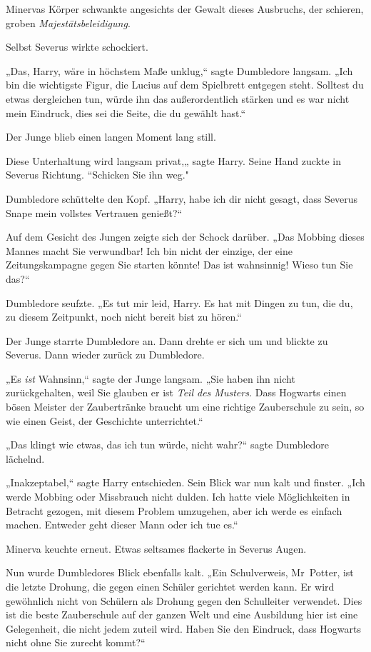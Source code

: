 {Minervas Körper schwankte angesichts der Gewalt dieses Ausbruchs, der schieren, groben \emph{Majestätsbeleidigung}.

Selbst Severus wirkte schockiert.

„Das, Harry, wäre in höchstem Maße unklug,“ sagte Dumbledore langsam. „Ich bin die wichtigste Figur, die Lucius auf dem Spielbrett entgegen steht. Solltest du etwas dergleichen tun, würde ihn das außerordentlich stärken und es war nicht mein Eindruck, dies sei die Seite, die du gewählt hast.“

Der Junge blieb einen langen Moment lang still.

Diese Unterhaltung wird langsam privat,„ sagte Harry. Seine Hand zuckte in Severus Richtung. “Schicken Sie ihn weg."

Dumbledore schüttelte den Kopf. „Harry, habe ich dir nicht gesagt, dass Severus Snape mein vollstes Vertrauen genießt?“

Auf dem Gesicht des Jungen zeigte sich der Schock darüber. „Das Mobbing dieses Mannes macht Sie verwundbar! Ich bin nicht der einzige, der eine Zeitungskampagne gegen Sie starten könnte! Das ist wahnsinnig! Wieso tun Sie das?“

Dumbledore seufzte. „Es tut mir leid, Harry. Es hat mit Dingen zu tun, die du, zu diesem Zeitpunkt, noch nicht bereit bist zu hören.“

Der Junge starrte Dumbledore an. Dann drehte er sich um und blickte zu Severus. Dann wieder zurück zu Dumbledore.

„Es \emph{ist} Wahnsinn,“ sagte der Junge langsam. „Sie haben ihn nicht zurückgehalten, weil Sie glauben er ist \emph{Teil des Musters.} Dass Hogwarts einen bösen Meister der Zaubertränke braucht um eine richtige Zauberschule zu sein, so wie einen Geist, der Geschichte unterrichtet.“

„Das klingt wie etwas, das ich tun würde, nicht wahr?“ sagte Dumbledore lächelnd.

„Inakzeptabel,“ sagte Harry entschieden. Sein Blick war nun kalt und finster. „Ich werde Mobbing oder Missbrauch nicht dulden. Ich hatte viele Möglichkeiten in Betracht gezogen, mit diesem Problem umzugehen, aber ich werde es einfach machen. Entweder geht dieser Mann oder ich tue es.“

Minerva keuchte erneut. Etwas seltsames flackerte in Severus Augen.

Nun wurde Dumbledores Blick ebenfalls kalt. „Ein Schulverweis, Mr~Potter, ist die letzte Drohung, die gegen einen Schüler gerichtet werden kann. Er wird gewöhnlich nicht von Schülern als Drohung gegen den Schulleiter verwendet. Dies ist die beste Zauberschule auf der ganzen Welt und eine Ausbildung hier ist eine Gelegenheit, die nicht jedem zuteil wird. Haben Sie den Eindruck, dass Hogwarts nicht ohne Sie zurecht kommt?“

}
